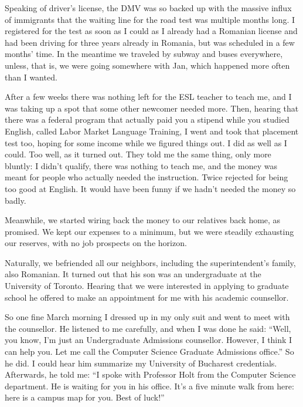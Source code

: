 \documentclass[12pt]{book}
\begin{document}
Speaking of driver's license, the DMV was so backed up with the massive
influx of immigrants that the waiting line for the road test was
multiple months long. I registered for the test as soon as I could as I
already had a Romanian license and had been driving for three years
already in Romania, but was scheduled in a few months' time. In the
meantime we traveled by subway and buses everywhere, unless, that is, we
were going somewhere with Jan, which happened more often than I wanted.

After a few weeks there was nothing left for the ESL teacher to teach
me, and I was taking up a spot that some other newcomer needed more.
Then, hearing that there was a federal program that actually paid you a
stipend while you studied English, called Labor Market Language
Training, I went and took that placement test too, hoping for some
income while we figured things out. I did as well as I could. Too well,
as it turned out. They told me the same thing, only more bluntly: I
didn't qualify, there was nothing to teach me, and the money was meant
for people who actually needed the instruction. Twice rejected for being
too good at English. It would have been funny if we hadn't needed the
money so badly.

Meanwhile, we started wiring back the money to our relatives back home,
as promised. We kept our expenses to a minimum, but we were steadily
exhausting our reserves, with no job prospects on the horizon.

Naturally, we befriended all our neighbors, including the
superintendent's family, also Romanian. It turned out that his son was
an undergraduate at the University of Toronto. Hearing that we were
interested in applying to graduate school he offered to make an
appointment for me with his academic counsellor.

So one fine March morning I dressed up in my only suit and went to meet
with the counsellor. He listened to me carefully, and when I was done he
said: ``Well, you know, I'm just an Undergraduate Admissions counsellor.
However, I think I can help you. Let me call the Computer Science
Graduate Admissions office.'' So he did. I could hear him summarize my
University of Bucharest credentials. Afterwards, he told me: ``I spoke
with Professor Holt from the Computer Science department. He is waiting
for you in his office. It's a five minute walk from here: here is a
campus map for you. Best of luck!''
\end{document}

